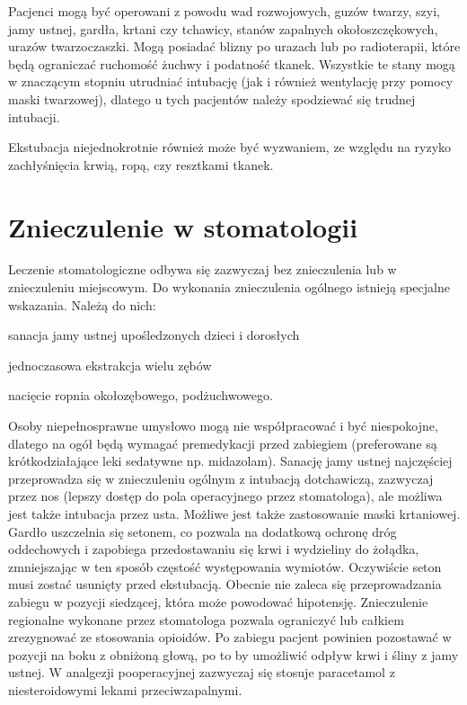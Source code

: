 \documentclass[a4paper, 12pt]{report}
\begin{document}
Pacjenci mogą być operowani z powodu wad rozwojowych, guzów twarzy,
szyi, jamy ustnej, gardła, krtani czy tchawicy, stanów zapalnych
okołoszczękowych, urazów twarzoczaszki. Mogą posiadać blizny po
urazach lub po radioterapii, które będą ograniczać ruchomość żuchwy i
podatność tkanek. Wszystkie te stany mogą w znaczącym stopniu
utrudniać intubację (jak i również wentylację przy pomocy maski
twarzowej), dlatego u tych pacjentów należy spodziewać się trudnej
intubacji.

Ekstubacja niejednokrotnie również może być wyzwaniem, ze względu na
ryzyko zachłyśnięcia krwią, ropą, czy resztkami tkanek.

\chapter{Znieczulenie w stomatologii}

Leczenie stomatologiczne odbywa się zazwyczaj bez znieczulenia lub w
znieczuleniu miejscowym. Do wykonania znieczulenia ogólnego istnieją
specjalne wskazania. Należą do nich: 
\begin{inparaenum}
\item sanacja jamy ustnej upośledzonych dzieci i dorosłych
\item jednoczasowa ekstrakcja wielu zębów
\item nacięcie ropnia okołozębowego, podżuchwowego.
\end{inparaenum}

Osoby niepełnosprawne umysłowo mogą nie współpracować i być
niespokojne, dlatego na ogół będą wymagać premedykacji przed zabiegiem
(preferowane są krótkodziałające leki sedatywne
np. midazolam). Sanację jamy ustnej najczęściej przeprowadza się w
znieczuleniu ogólnym z intubacją dotchawiczą, zazwyczaj przez nos
(lepszy dostęp do pola operacyjnego przez stomatologa), ale możliwa
jest także intubacja przez usta. Możliwe jest także zastosowanie maski
krtaniowej. Gardło uszczelnia się setonem, co pozwala na dodatkową
ochronę dróg oddechowych i zapobiega przedostawaniu się krwi i
wydzieliny do żołądka, zmniejszając w ten sposób częstość występowania
wymiotów. Oczywiście seton musi zostać usunięty przed
ekstubacją. Obecnie nie zaleca się przeprowadzania zabiegu w pozycji
siedzącej, która może powodować hipotensję. Znieczulenie regionalne
wykonane przez stomatologa pozwala ograniczyć lub całkiem zrezygnować
ze stosowania opioidów. Po zabiegu pacjent powinien pozostawać w
pozycji na boku z obniżoną głową, po to by umożliwić odpływ krwi i
śliny z jamy ustnej. W analgezji pooperacyjnej zazwyczaj się stosuje
paracetamol z niesteroidowymi lekami przeciwzapalnymi. 
\end{document}
